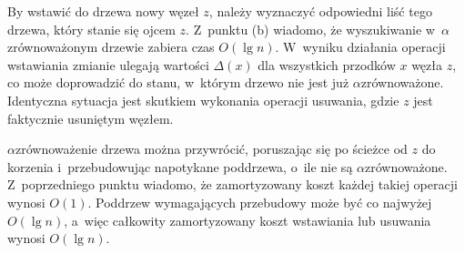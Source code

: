 \subproblem %
By wstawić do drzewa nowy węzeł $z$, należy wyznaczyć odpowiedni liść tego drzewa, który stanie się ojcem $z$.
Z~punktu (b) wiadomo, że wyszukiwanie w~$\alpha$\nbhyphen zrównoważonym drzewie zabiera czas $O(\lg n)$.
W~wyniku działania operacji wstawiania zmianie ulegają wartości $\Delta(x)$ dla wszystkich przodków $x$ węzła $z$, co może doprowadzić do stanu, w~którym drzewo nie jest już $\alpha$\nbhyphen zrównoważone.
Identyczna sytuacja jest skutkiem wykonania operacji usuwania, gdzie $z$ jest faktycznie usuniętym węzłem.

$\alpha$\nbhyphen zrównoważenie drzewa można przywrócić, poruszając się po ścieżce od $z$ do korzenia i~przebudowując napotykane poddrzewa, o~ile nie są $\alpha$\nbhyphen zrównoważone.
Z~poprzedniego punktu wiadomo, że zamortyzowany koszt każdej takiej operacji wynosi $O(1)$.
Poddrzew wymagających przebudowy może być co najwyżej $O(\lg n)$, a~więc całkowity zamortyzowany koszt wstawiania lub usuwania wynosi $O(\lg n)$.
